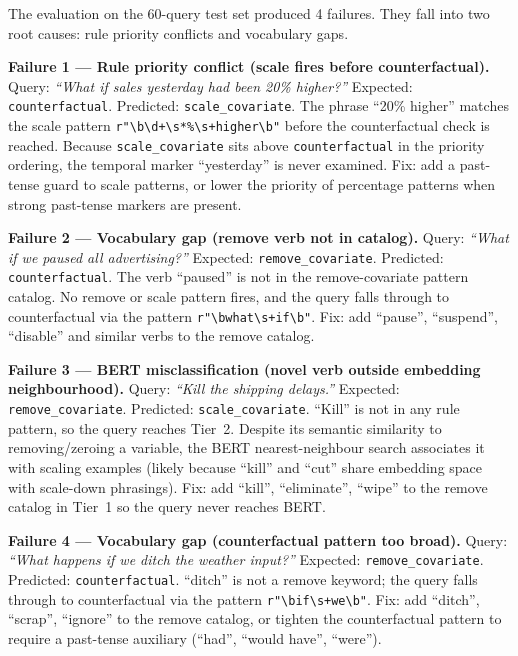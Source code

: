 \documentclass[conference]{IEEEtran}
\begin{document}
The evaluation on the 60-query test set produced 4 failures. They fall into two root causes: rule priority conflicts and vocabulary gaps.

\textbf{Failure 1 — Rule priority conflict (scale fires before counterfactual).}
Query: \textit{``What if sales yesterday had been 20\% higher?''}
Expected: \texttt{counterfactual}. Predicted: \texttt{scale\_covariate}.
The phrase ``20\% higher'' matches the scale pattern \texttt{r"\textbackslash b\textbackslash d+\textbackslash s*\%\textbackslash s+higher\textbackslash b"} before the counterfactual check is reached. Because \texttt{scale\_covariate} sits above \texttt{counterfactual} in the priority ordering, the temporal marker ``yesterday'' is never examined. Fix: add a past-tense guard to scale patterns, or lower the priority of percentage patterns when strong past-tense markers are present.

\textbf{Failure 2 — Vocabulary gap (remove verb not in catalog).}
Query: \textit{``What if we paused all advertising?''}
Expected: \texttt{remove\_covariate}. Predicted: \texttt{counterfactual}.
The verb ``paused'' is not in the remove-covariate pattern catalog. No remove or scale pattern fires, and the query falls through to counterfactual via the pattern \texttt{r"\textbackslash bwhat\textbackslash s+if\textbackslash b"}. Fix: add ``pause'', ``suspend'', ``disable'' and similar verbs to the remove catalog.

\textbf{Failure 3 — BERT misclassification (novel verb outside embedding neighbourhood).}
Query: \textit{``Kill the shipping delays.''}
Expected: \texttt{remove\_covariate}. Predicted: \texttt{scale\_covariate}.
``Kill'' is not in any rule pattern, so the query reaches Tier~2. Despite its semantic similarity to removing/zeroing a variable, the BERT nearest-neighbour search associates it with scaling examples (likely because ``kill'' and ``cut'' share embedding space with scale-down phrasings). Fix: add ``kill'', ``eliminate'', ``wipe'' to the remove catalog in Tier~1 so the query never reaches BERT.

\textbf{Failure 4 — Vocabulary gap (counterfactual pattern too broad).}
Query: \textit{``What happens if we ditch the weather input?''}
Expected: \texttt{remove\_covariate}. Predicted: \texttt{counterfactual}.
``ditch'' is not a remove keyword; the query falls through to counterfactual via the pattern \texttt{r"\textbackslash bif\textbackslash s+we\textbackslash b"}. Fix: add ``ditch'', ``scrap'', ``ignore'' to the remove catalog, or tighten the counterfactual pattern to require a past-tense auxiliary (``had'', ``would have'', ``were'').
\end{document}
